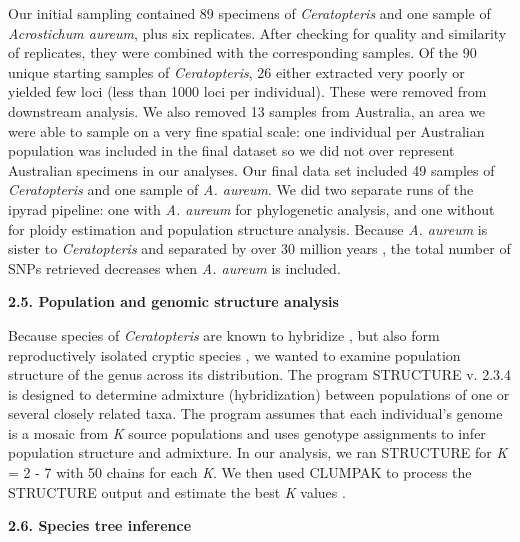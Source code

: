 \documentclass[12pt]{article}
\begin{document}
\begin{flushleft}
Our initial sampling contained 89 specimens of \textit{Ceratopteris} and one sample of \textit{Acrostichum aureum}, plus six replicates. After checking for quality and similarity of replicates, they were combined with the corresponding samples. Of the 90 unique starting samples of \textit{Ceratopteris}, 26 either extracted very poorly or yielded few loci (less than 1000 loci per individual). These were removed from downstream analysis. We also removed 13 samples from Australia, an area we were able to sample on a very fine spatial scale: one individual per Australian population was included in the final dataset so we did not over represent Australian specimens in our analyses. Our final data set included 49 samples of \textit{Ceratopteris} and one sample of \textit{A. aureum}.  We did two separate runs of the ipyrad pipeline: one with \textit{A. aureum} for phylogenetic analysis, and one without for ploidy estimation and population structure analysis. Because \textit{A. aureum} is sister to \textit{Ceratopteris} and separated by over 30 million years \autocite{PPGI}, the total number of SNPs retrieved decreases when \textit{A. aureum} is included.


\textbf{2.5. Population and genomic structure analysis}

Because species of \textit{Ceratopteris} are known to hybridize \autocite{hickok1974}, but also form reproductively isolated cryptic species \autocite{Masuyama2002}, we wanted to examine population structure of the genus across its distribution. The program {\small{STRUCTURE}} v. 2.3.4 \autocite{Pritchard2000} is designed to determine admixture (hybridization) between populations of one or several closely related taxa. The program assumes that each individual's genome is a mosaic from \textit{K} source populations and uses genotype assignments to infer population structure and admixture. In our analysis, we ran {\small{STRUCTURE}} for \textit{K} = 2 - 7 with 50 chains for each \textit{K}. We then used {\small{CLUMPAK}} \autocite{Kopelman2015} to process the {\small{STRUCTURE}} output and estimate the best \textit{K} values \autocite{Evanno2005, Pritchard2000}.

\textbf{2.6. Species tree inference}


\end{flushleft}
\end{document}
